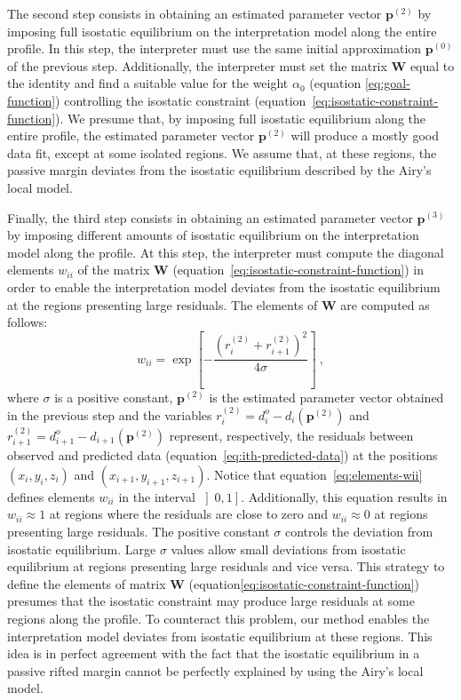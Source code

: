 \documentclass[manuscript]{geophysics}
\begin{document}
The second step consists in obtaining an estimated parameter vector $\mathbf{p}^{(2)}$
by imposing full isostatic equilibrium on the interpretation model along the entire profile.
In this step, the interpreter must use the same initial approximation $\mathbf{p}^{(0)}$
of the previous step. 
Additionally, the interpreter must set the matrix $\mathbf{W}$
equal to the identity and find a suitable value for the weight $\alpha_{0}$ 
(equation \ref{eq:goal-function}) controlling the isostatic constraint 
(equation~\ref{eq:isostatic-constraint-function}).
We presume that, by imposing full isostatic equilibrium along the entire profile,
the estimated parameter vector $\mathbf{p}^{(2)}$ will produce a mostly good data fit,
except at some isolated regions. 
We assume that, at these regions, the passive margin deviates
from the isostatic equilibrium described by the Airy's local model.

Finally, the third step consists in obtaining an estimated parameter vector $\mathbf{p}^{(3)}$
by imposing different amounts of isostatic equilibrium on the interpretation model along the
profile. At this step, the interpreter must compute the diagonal elements 
$w_{ii}$ of the matrix $\mathbf{W}$ (equation~\ref{eq:isostatic-constraint-function}) 
in order to enable the interpretation model deviates from the isostatic equilibrium 
at the regions presenting large residuals. 
The elements of $\mathbf{W}$ are computed as follows:
\begin{equation} \label{eq:elements-wii}
w_{ii} = 
\exp \left[ - \frac{ \left( r_{i}^{(2)} + r_{i+1}^{(2)} \right)^{2}}{4 \sigma} \right] \: ,
\end{equation}
where $\sigma$ is a positive constant, $\mathbf{p}^{(2)}$ is the estimated parameter vector
obtained in the previous step and the variables
$r_{i}^{(2)} = d^{o}_{i} - d_{i} \left( \mathbf{p}^{(2)} \right)$ and 
$r_{i+1}^{(2)} = d^{o}_{i+1} - d_{i+1} \left(\mathbf{p}^{(2)} \right)$ represent,
respectively, the residuals between observed and predicted data
(equation~\ref{eq:ith-predicted-data}) at the positions $(x_{i}, y_{i}, z_{i})$ and 
$(x_{i+1}, y_{i+1}, z_{i+1})$. Notice that equation~\ref{eq:elements-wii} defines elements 
$w_{ii}$ in the interval $\left] 0, 1 \right]$. Additionally, this equation results in 
$w_{ii} \approx 1$ at regions where the residuals are close to zero and 
$w_{ii} \approx 0$ at regions presenting large residuals.
The positive constant $\sigma$ controls the deviation from isostatic equilibrium.
Large $\sigma$ values allow small deviations from isostatic equilibrium at
regions presenting large residuals and vice versa.
This strategy to define the elements of matrix $\mathbf{W}$ 
(equation\ref{eq:isostatic-constraint-function}) presumes that the isostatic constraint may
produce large residuals at some regions along the profile. To counteract this problem,
our method enables the interpretation model deviates from isostatic equilibrium at these 
regions. This idea is in perfect agreement with the fact that the isostatic equilibrium
in a passive rifted margin cannot be perfectly explained by using the Airy's local model.
\end{document}
